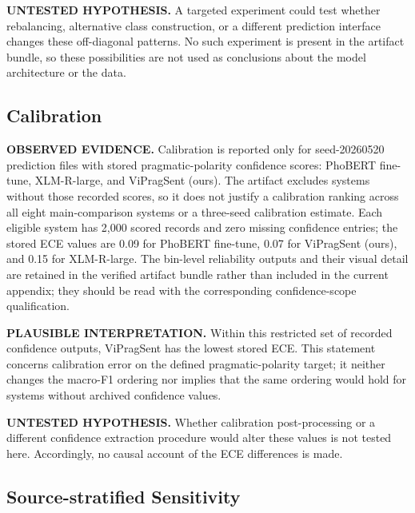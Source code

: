 \textbf{UNTESTED HYPOTHESIS.} A targeted experiment could test whether rebalancing, alternative class construction, or a different prediction interface changes these off-diagonal patterns.  No such experiment is present in the artifact bundle, so these possibilities are not used as conclusions about the model architecture or the data.

\subsection{Calibration}

\textbf{OBSERVED EVIDENCE.} Calibration is reported only for seed-20260520 prediction files with stored pragmatic-polarity confidence scores: PhoBERT fine-tune, XLM-R-large, and ViPragSent (ours).  The artifact excludes systems without those recorded scores, so it does not justify a calibration ranking across all eight main-comparison systems or a three-seed calibration estimate.
Each eligible system has 2,000 scored records and zero missing confidence entries; the stored ECE values are 0.09 for PhoBERT fine-tune, 0.07 for ViPragSent (ours), and 0.15 for XLM-R-large.
The bin-level reliability outputs and their visual detail are retained in the verified artifact bundle rather than included in the current appendix; they should be read with the corresponding confidence-scope qualification.

\textbf{PLAUSIBLE INTERPRETATION.} Within this restricted set of recorded confidence outputs, ViPragSent has the lowest stored ECE.  This statement concerns calibration error on the defined pragmatic-polarity target; it neither changes the macro-F1 ordering nor implies that the same ordering would hold for systems without archived confidence values.

\textbf{UNTESTED HYPOTHESIS.} Whether calibration post-processing or a different confidence extraction procedure would alter these values is not tested here.  Accordingly, no causal account of the ECE differences is made.

\subsection{Source-stratified Sensitivity}


